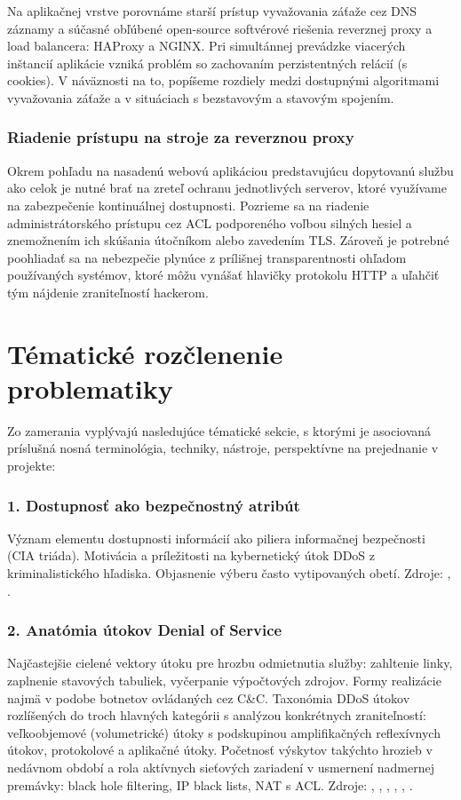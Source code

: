 \documentclass[11pt, a4paper]{article}
\begin{document}
Na aplikačnej vrstve porovnáme starší prístup vyvažovania záťaže cez DNS záznamy a súčasné obľúbené 
open-source softvérové riešenia reverznej proxy a load balancera: HAProxy a NGINX. Pri simultánnej prevádzke 
viacerých inštancií aplikácie vzniká problém so zachovaním perzistentných relácií (s cookies). V náväznosti na to, popíšeme rozdiely medzi dostupnými algoritmami vyvažovania záťaže a v situáciach s bezstavovým a stavovým spojením.

\subsubsection*{Riadenie prístupu na stroje za reverznou proxy}
Okrem pohľadu na nasadenú webovú aplikáciou predstavujúcu dopytovanú službu ako celok je nutné
brať na zreteľ ochranu jednotlivých serverov, ktoré využívame na zabezpečenie kontinuálnej dostupnosti.
Pozrieme sa na riadenie administrátorského prístupu cez ACL podporeného voľbou 
silných hesiel a znemožnením ich skúšania útočníkom alebo zavedením TLS. Zároveň je potrebné poohliadať
sa na nebezpečie plynúce z prílišnej transparentnosti ohľadom používaných systémov, ktoré môžu vynášať hlavičky protokolu HTTP a uľahčiť tým nájdenie zraniteľností hackerom.

\section*{Tématické rozčlenenie problematiky}
Zo zamerania vyplývajú nasledujúce tématické sekcie, s ktorými je asociovaná príslušná nosná terminológia, techniky, nástroje, perspektívne na prejednanie v projekte:

\subsubsection*{1. Dostupnosť ako bezpečnostný atribút}
Význam elementu dostupnosti informácií ako piliera 
informačnej bezpečnosti (CIA triáda). Motivácia a príležitosti na kybernetický útok DDoS z kriminalistického hľadiska. Objasnenie výberu často vytipovaných obetí. Zdroje: \cite{availability}, \cite{why-attack}.

\subsubsection*{2. Anatómia útokov Denial of Service}
Najčastejšie cielené vektory útoku pre hrozbu odmietnutia 
služby: zahltenie linky, zaplnenie stavových tabuliek, vyčerpanie výpočtových zdrojov. Formy realizácie 
najmä v podobe botnetov ovládaných cez C\&C. Taxonómia DDoS útokov rozlíšených do troch hlavných 
kategórii s analýzou konkrétnych zraniteľností: veľkoobjemové (volumetrické) útoky s 
podskupinou amplifikačných reflexívnych útokov, protokolové a aplikačné útoky. Početnosť výskytov takýchto 
hrozieb v nedávnom období a rola aktívnych sieťových zariadení v usmernení nadmernej premávky: black hole filtering, IP black lists, NAT s ACL. Zdroje: \cite{ddos-anatomy-2004}, 
\cite{botnets}, \cite{radware-ddos}, \cite{enisa-ddos}, \cite{ddos-attacks}, \cite{csirt-ddos}.
\end{document}
